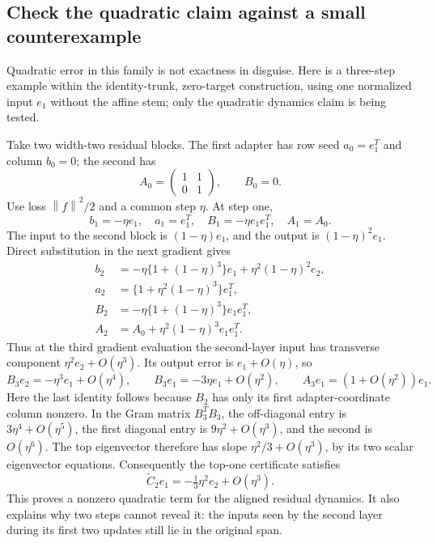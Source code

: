 \documentclass[12pt,a4paper]{article}
\theoremstyle{readable}
\theoremstyle{definition}\newtheorem{example}[theorem]{Example}
\newcommand{\norm}[1]{\left\|#1\right\|}
\begin{document}
\subsection{Check the quadratic claim against a small counterexample}
Quadratic error in this family is not exactness in disguise. Here is a three-step example within the identity-trunk, zero-target construction, using one normalized input \(e_1\) without the affine stem; only the quadratic dynamics claim is being tested.

Take two width-two residual blocks. The first adapter has row seed \(a_0=e_1^T\) and column \(b_0=0\); the second has
\[
A_0=\begin{pmatrix}1&1\\0&1\end{pmatrix},\qquad B_0=0.
\]
Use loss \(\norm f^2/2\) and a common step \(\eta\). At step one,
\[
b_1=-\eta e_1,\quad a_1=e_1^T,\quad
B_1=-\eta e_1e_1^T,\quad A_1=A_0.
\]
The input to the second block is \((1-\eta)e_1\), and the output is \((1-\eta)^2e_1\). Direct substitution in the next gradient gives
\begin{align*}
b_2&=-\eta\{1+(1-\eta)^3\}e_1+\eta^2(1-\eta)^2e_2,\\
a_2&=\{1+\eta^2(1-\eta)^3\}e_1^T,\\
B_2&=-\eta\{1+(1-\eta)^3\}e_1e_1^T,\\
A_2&=A_0+\eta^2(1-\eta)^3e_1e_1^T.
\end{align*}
Thus at the third gradient evaluation the second-layer input has transverse component \(\eta^2e_2+O(\eta^3)\). Its output error is \(e_1+O(\eta)\), so
\[
B_3e_2=-\eta^3e_1+O(\eta^4),\qquad
B_3e_1=-3\eta e_1+O(\eta^2),
\qquad A_3e_1=(1+O(\eta^2))e_1.
\]
Here the last identity follows because \(B_2\) has only its first adapter-coordinate column nonzero. In the Gram matrix \(B_3^TB_3\), the off-diagonal entry is \(3\eta^4+O(\eta^5)\), the first diagonal entry is \(9\eta^2+O(\eta^3)\), and the second is \(O(\eta^6)\). The top eigenvector therefore has slope \(\eta^2/3+O(\eta^3)\), by its two scalar eigenvector equations. Consequently the top-one certificate satisfies
\[
\widetilde C_2e_1=-\tfrac13\eta^2e_2+O(\eta^3).
\]
This proves a nonzero quadratic term for the aligned residual dynamics. It also explains why two steps cannot reveal it: the inputs seen by the second layer during its first two updates still lie in the original span.
\end{document}
